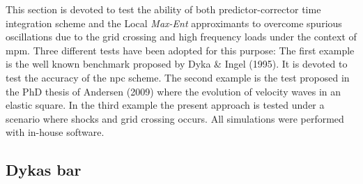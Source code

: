 \documentclass[preprint,12pt,a4paper]{elsarticle}
\begin{document}
This section is devoted to test the ability of both predictor-corrector
time integration scheme and the Local \textit{Max-Ent} approximants to
overcome spurious oscillations due to the grid crossing and high
frequency loads under the context of \acrshort{mpm}. Three different tests have been adopted for this purpose: The first example is the well known benchmark proposed by Dyka \& Ingel (1995)\cite{Dyka1995}. It is devoted to test the accuracy of the \acrfull{npc} scheme. The second example is the test proposed in the PhD thesis of Andersen (2009)\cite{thesis_Andersen_2009} where the evolution of velocity waves in an elastic square. In the third example the present approach is tested under a scenario where shocks and grid crossing occurs. All simulations were performed with in-house software.

\subsection{Dyka\textquotesingle s bar \cite{Dyka1995}}
\label{sec:dyka-bar}
\end{document}
